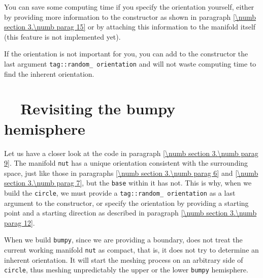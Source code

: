You can save some computing time if you specify the orientation
yourself, either by providing more information to the {\small\tt {}} constructor as shown
in paragraph \ref{\numb section 3.\numb parag 15} or by attaching this information to
the manifold itself (this feature is not implemented yet).
 
If the orientation is not important for you, you can add to the {\small\tt {}} constructor
the last argument {\small\tt \textcolor{tag}{tag}::random\_\,orientation} and {\maniFEM} will not waste
computing time to find the inherent orientation.
\vskip 1mm

\section{~~Revisiting the bumpy hemisphere}\label{\numb section 3.\numb parag 14}

Let us have a closer look at the code in paragraph \ref{\numb section 3.\numb parag 9}.
The manifold {\small\tt nut} has a unique orientation consistent with the surrounding
space, just like those in paragraphs \ref{\numb section 3.\numb parag 6} and
\ref{\numb section 3.\numb parag 7}, but the {\small\tt base} within it has not.
This is why, when we build the {\small\tt circle}, we must provide a
{\small\tt \textcolor{tag}{tag}::random\_\,orientation} as a last argument to the {\small\tt {}} constructor,
or specify the orientation by providing a starting point and a starting direction
as described in paragraph \ref{\numb section 3.\numb parag 12}.

When we build {\small\tt bumpy}, since we are providing a boundary, {\maniFEM} does not treat
the current working manifold {\small\tt nut} as compact, that is, it does not try to determine an
inherent orientation.
It will start the meshing process on an arbitrary side of {\small\tt circle}, thus meshing
unpredictably the upper or the lower {\small\tt bumpy} hemisphere.

